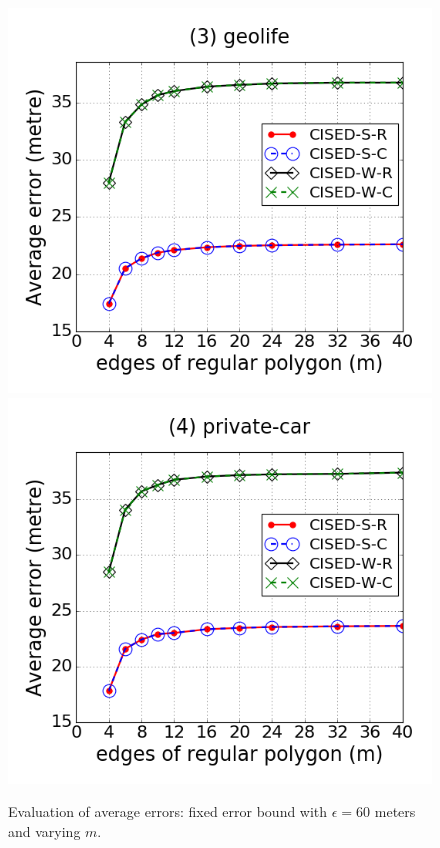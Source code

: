 \begin{figure}[tb!]
\includegraphics[scale = 0.240]{figures/Exp-M-e-60-error-geolife.png}
\includegraphics[scale = 0.240]{figures/Exp-M-e-60-error-private.png}
\vspace{-1ex}
\caption{\small Evaluation of average errors: fixed error bound with $\epsilon = 60$ meters and varying $m$.}
\label{fig:m-error-e60}
\vspace{-1ex}
\end{figure}


